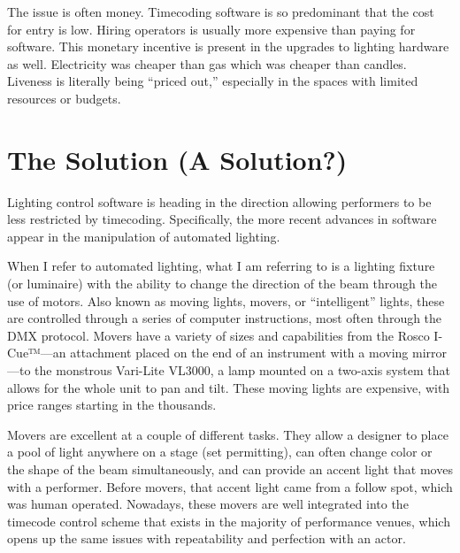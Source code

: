 \documentclass[
    12pt,
    twoside,
    bibstyle=chicago,
    headerstyle=uppercase,
	bibfile=biblatex_updating.bib
]{reedthesis}
\begin{document}
The issue is often money. Timecoding software is so predominant that the cost for entry is low. Hiring operators is usually more expensive than paying for software. This monetary incentive is present in the upgrades to lighting hardware as well. Electricity was cheaper than gas which was cheaper than candles. Liveness is literally being “priced out,” especially in the spaces with limited resources or budgets.

\section{The Solution (A Solution?)}
Lighting control software is heading in the direction allowing performers to be less restricted by timecoding. Specifically, the more recent advances in software appear in the manipulation of automated lighting. 

When I refer to automated lighting, what I am referring to is a lighting fixture (or luminaire) with the ability to change the direction of the beam through the use of motors. Also known as moving lights, movers, or “intelligent” lights, these are controlled through a series of computer instructions, most often through the DMX protocol. Movers have a variety of sizes and capabilities from the Rosco I-Cue™---an attachment placed on the end of an instrument with a moving mirror---to the monstrous Vari-Lite VL3000, a lamp mounted on a two-axis system that allows for the whole unit to pan and tilt. These moving lights are expensive, with price ranges starting in the thousands.

Movers are excellent at a couple of different tasks. They allow a designer to place a pool of light anywhere on a stage (set permitting), can often change color or the shape of the beam simultaneously, and can provide an accent light that moves with a performer. Before movers, that accent light came from a follow spot, which was human operated. Nowadays, these movers are well integrated into the timecode control scheme that exists in the majority of performance venues, which opens up the same issues with repeatability and perfection with an actor. 
\end{document}
